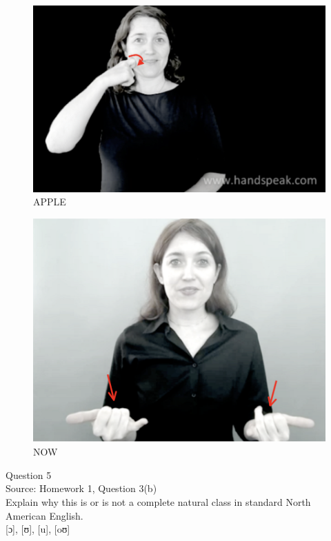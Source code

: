 \documentclass[12pt]{article}
\begin{document}
\begin{figure}[H]
\includegraphics{../images/asl_apple.png}
\caption{APPLE}
\end{figure}
\begin{figure}[H]
\includegraphics{../images/asl_now.png}
\caption{NOW}
\end{figure}

\newpage

{\large Question 5}\\

Source: Homework 1, Question 3(b)\\

Explain why this is or is not a complete natural class in standard North American English.\\

{[ɔ]}, {[ʊ]}, {[u]}, {[oʊ]}
\end{document}
